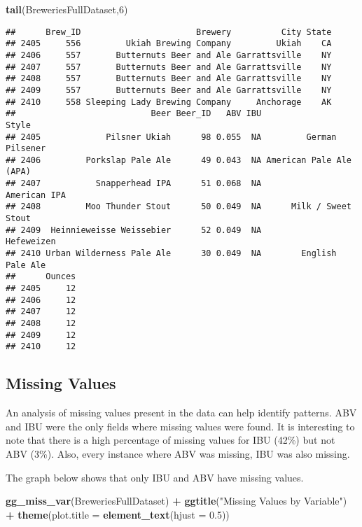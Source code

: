 \documentclass[]{article}
\newenvironment{Shaded}{\begin{snugshade}}{\end{snugshade}}
\newcommand{\DataTypeTok}[1]{\textcolor[rgb]{0.13,0.29,0.53}{#1}}
\newcommand{\DecValTok}[1]{\textcolor[rgb]{0.00,0.00,0.81}{#1}}
\newcommand{\FloatTok}[1]{\textcolor[rgb]{0.00,0.00,0.81}{#1}}
\newcommand{\KeywordTok}[1]{\textcolor[rgb]{0.13,0.29,0.53}{\textbf{#1}}}
\newcommand{\NormalTok}[1]{#1}
\newcommand{\OperatorTok}[1]{\textcolor[rgb]{0.81,0.36,0.00}{\textbf{#1}}}
\newcommand{\StringTok}[1]{\textcolor[rgb]{0.31,0.60,0.02}{#1}}
\begin{document}
\begin{Shaded}
\begin{Highlighting}[]
\KeywordTok{tail}\NormalTok{(BreweriesFullDataset,}\DecValTok{6}\NormalTok{)}
\end{Highlighting}
\end{Shaded}

\begin{verbatim}
##      Brew_ID                       Brewery          City State
## 2405     556         Ukiah Brewing Company         Ukiah    CA
## 2406     557       Butternuts Beer and Ale Garrattsville    NY
## 2407     557       Butternuts Beer and Ale Garrattsville    NY
## 2408     557       Butternuts Beer and Ale Garrattsville    NY
## 2409     557       Butternuts Beer and Ale Garrattsville    NY
## 2410     558 Sleeping Lady Brewing Company     Anchorage    AK
##                           Beer Beer_ID   ABV IBU                   Style
## 2405             Pilsner Ukiah      98 0.055  NA         German Pilsener
## 2406         Porkslap Pale Ale      49 0.043  NA American Pale Ale (APA)
## 2407           Snapperhead IPA      51 0.068  NA            American IPA
## 2408         Moo Thunder Stout      50 0.049  NA      Milk / Sweet Stout
## 2409  Heinnieweisse Weissebier      52 0.049  NA              Hefeweizen
## 2410 Urban Wilderness Pale Ale      30 0.049  NA        English Pale Ale
##      Ounces
## 2405     12
## 2406     12
## 2407     12
## 2408     12
## 2409     12
## 2410     12
\end{verbatim}

\hypertarget{missing-values}{%
\subsection{Missing Values}\label{missing-values}}

An analysis of missing values present in the data can help identify
patterns. ABV and IBU were the only fields where missing values were
found. It is interesting to note that there is a high percentage of
missing values for IBU (42\%) but not ABV (3\%). Also, every instance
where ABV was missing, IBU was also missing.

The graph below shows that only IBU and ABV have missing values.

\begin{Shaded}
\begin{Highlighting}[]
\KeywordTok{gg_miss_var}\NormalTok{(BreweriesFullDataset) }\OperatorTok{+}
\StringTok{  }\KeywordTok{ggtitle}\NormalTok{(}\StringTok{"Missing Values by Variable"}\NormalTok{) }\OperatorTok{+}\StringTok{ }
\StringTok{  }\KeywordTok{theme}\NormalTok{(}\DataTypeTok{plot.title =} \KeywordTok{element_text}\NormalTok{(}\DataTypeTok{hjust =} \FloatTok{0.5}\NormalTok{))}
\end{Highlighting}
\end{Shaded}
\end{document}
